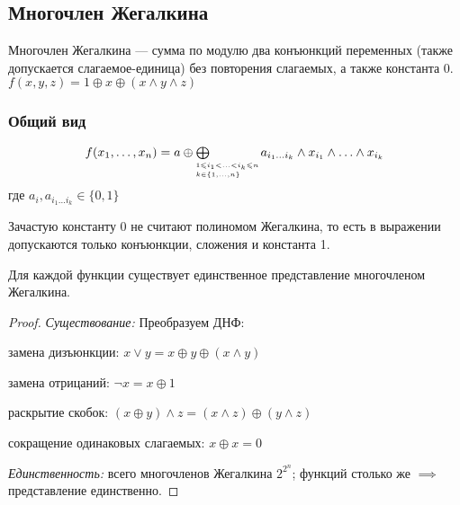 \subsection{Многочлен Жегалкина}

\begin{defn}
    Многочлен Жегалкина --- сумма по модулю два конъюнкций переменных (также допускается слагаемое-единица) без повторения слагаемых, а также константа 0.\\
    \example $f(x, y, z) = 1 \oplus x \oplus (x \wedge y \wedge z)$
\end{defn}

\subsubsection*{Общий вид}

\[ \def\useanchorwidth{F}\stackMath
    f(x_1, \ldots, x_n) = a \oplus \mathop{\stackunder{\bigoplus}{\def\stackalignment{l}%
    \stackunder[2pt]{\scriptscriptstyle 1 \leq i_1 < \ldots < i_k \leq n}
                    {\scriptscriptstyle k \in \{1, \ldots, n\}}
    }} a_{i_1 \ldots i_k} \wedge x_{i_1} \wedge \ldots \wedge x_{i_k}\]
где $a_i, a_{i_1 \ldots i_k} \in \{0, 1\}$\\

\begin{notice}
    Зачастую константу 0 не считают полиномом Жегалкина, то есть в выражении допускаются только конъюнкции, сложения и константа 1.
\end{notice}

\begin{theorem}
    Для каждой функции существует единственное представление многочленом Жегалкина.
\end{theorem}

\begin{proof}

    \textsl{Существование:} Преобразуем ДНФ:

    замена дизъюнкции: $x \vee y = x \oplus y \oplus (x \wedge y)$
    
    замена отрицаний: $\neg x = x \oplus 1$ 
    
    раскрытие скобок: $(x \oplus y) \wedge z = (x \wedge z) \oplus (y \wedge z)$
    
    сокращение одинаковых слагаемых: $x \oplus x = 0$
    
    \textsl{Единственность:} всего многочленов Жегалкина $2^{2^{n}}$; функций столько же $\implies$ представление единственно.
\end{proof}